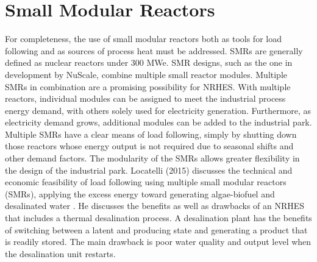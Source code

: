 \documentclass[12pt]{UIdahoMastersThesis}
\begin{document}
\section{Small Modular Reactors}
For completeness, the use of small modular reactors both as tools for load following and as sources of process heat must be addressed. SMRs are generally defined as nuclear reactors under 300 MWe. SMR designs, such as the one in development by NuScale, combine multiple small reactor modules. Multiple SMRs in combination are a promising possibility for NRHES.  With multiple reactors, individual modules can be assigned to meet the industrial process energy demand, with others solely used for electricity generation. Furthermore, as electricity demand grows, additional modules can be added to the industrial park. Multiple SMRs have a clear means of load following, simply by shutting down those reactors whose energy output is not required due to seasonal shifts and other demand factors. The modularity of the SMRs allows greater flexibility in the design of the industrial park.  Locatelli (2015) discusses the technical and economic feasibility of load following using multiple small modular reactors (SMRs), applying the excess energy toward generating algae-biofuel and desalinated water \cite{Locatelli2015}. He discusses the benefits as well as drawbacks of an NRHES that includes a thermal desalination process. A desalination plant has the benefits of switching between a latent and producing state and generating a product that is readily stored. The main drawback is poor water quality and output level when the desalination unit restarts.
\end{document}
